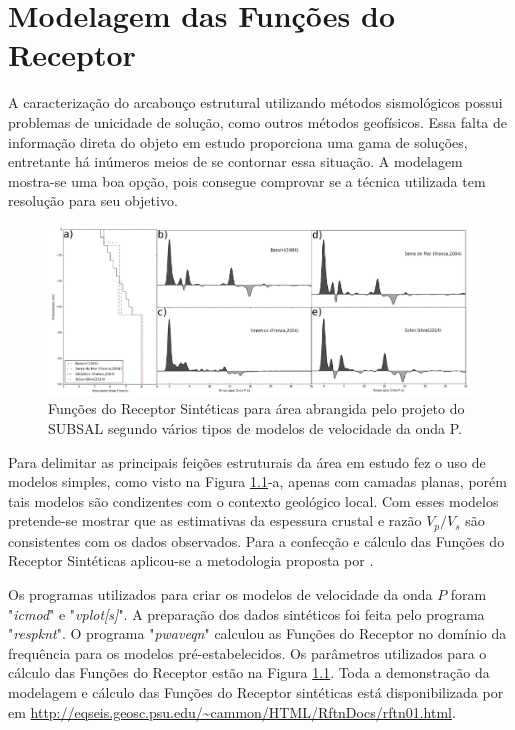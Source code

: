 \chapter{Modelagem das Funções do Receptor}
A caracterização do arcabouço estrutural utilizando métodos sismológicos possui problemas de unicidade de solução, como outros métodos geofísicos.  Essa falta de informação direta do objeto em estudo proporciona uma gama de soluções, entretante há inúmeros meios de se contornar essa situação. A modelagem mostra-se uma boa opção, pois consegue comprovar se a técnica utilizada tem resolução para seu objetivo.

\begin{figure}[!ht]
\centering
\includegraphics[scale=0.25]{modelagem_RF.png}
\caption{Funções do Receptor Sintéticas para área abrangida pelo projeto do SUBSAL segundo vários tipos de modelos de velocidade da onda P.}
\label{modelagem}
\end{figure}

Para delimitar as principais feições estruturais da área em estudo fez o uso de modelos simples, como visto na Figura \ref{modelagem}-a, apenas com camadas planas, porém tais modelos são condizentes com o contexto geológico local. Com esses modelos pretende-se mostrar que as estimativas da espessura crustal e razão $V_{p}/V_{s}$ são consistentes com os dados observados. Para a confecção e cálculo das Funções do Receptor Sintéticas aplicou-se a metodologia proposta por \cite{Ammon_waterlevel_1997}. 

Os programas utilizados para criar os modelos de velocidade da onda $P$ foram "\textit{icmod}" e "\textit{vplot[s]}". A preparação dos dados sintéticos foi feita pelo programa "\textit{respknt}". O programa "\textit{pwaveqn}" calculou as Funções do Receptor no domínio da frequência para os modelos pré-estabelecidos. Os parâmetros utilizados para o cálculo das Funções do Receptor estão na Figura \ref{modelagem}. Toda a demonstração da modelagem e cálculo das Funções do Receptor sintéticas está disponibilizada por \cite{Ammon_waterlevel_1997} em \url{http://eqseis.geosc.psu.edu/~cammon/HTML/RftnDocs/rftn01.html}.

